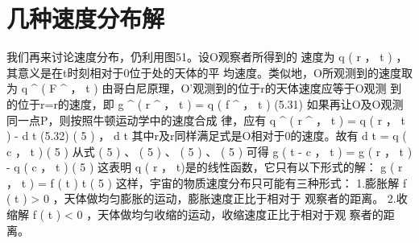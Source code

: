 \section{几种速度分布解}\label{sec:05.03}

我们再来讨论速度分布，仍利用图51。设O观察者所得到的
速度为 q \left( r ， t \right)  ，其意义是在t时刻相对于0位于处的天体的平
均速度。类似地，O所观测到的速度取为 q ^ { \prime } \left( F ^ { \prime } ， t \right)
由哥白尼原理，O'观测到的位于r的天体速度应等于O观测
到的位于r=r的速度，即
g ^ { \prime } \left( r ^ { \prime } ， t \right) = q \left( f ^ { \prime } ， t \right)
(5.31)
如果再让O及O观测同一点P，则按照牛顿运动学中的速度合成
律，应有
q ^ { \prime } \left( r ^ { \prime } ， t \right) = q \left( r ， t \right) -  { d t }
(5.32)
\left( 5   \right) ，  { d t }
其中r及r同样满足式是O相对于0的速度。故有
 { d t } = q \left( c ， t \right)
\left( 5   \right)
从式 \left( 5   \right)  、 \left( 5   \right)  、 \left( 5   \right)  、 \left( 5   \right)  可得
g \left( t - c ， t \right) = g \left( r ， t \right) - q \left( c ， t \right)
\left( 5   \right)
这表明 q \left( r ，  t)是的线性函数，它只有以下形式的解：
g \left( r ， t \right) = f \left( t \right) t
\left( 5   \right)
这样，宇宙的物质速度分布只可能有三种形式：
1.膨胀解
f \left( t \right) > 0  ，天体做均匀膨胀的运动，膨胀速度正比于相对于
观察者的距离。
2.收缩解
f \left( t \right) < 0  ，天体做均匀收缩的运动，收缩速度正比于相对于观
察者的距离。